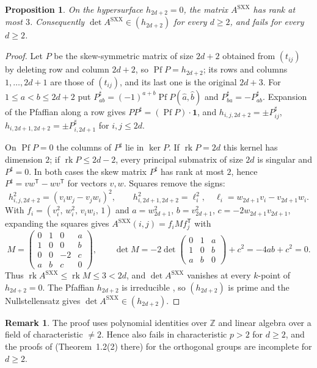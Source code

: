 \documentclass[11pt]{article}
\newtheorem{proposition}[theorem]{Proposition}
\theoremstyle{definition}
\newtheorem{remark}[theorem]{Remark}
\newcommand{\rk}{\operatorname{rk}}
\newcommand{\Asxx}{A^{\mathrm{SXX}}}
\DeclareMathOperator{\Pf}{Pf}
\begin{document}
\begin{proposition}\label{prop:rank3}
On the hypersurface $h_{2d+2}=0$, the matrix $\Asxx$ has rank at most $3$. Consequently $\det\Asxx\in(h_{2d+2})$ for every $d\ge2$, and \cite[Lemma~5.2]{SXX23} fails for every $d\ge2$.
\end{proposition}
\begin{proof}
Let $P$ be the skew-symmetric matrix of size $2d+2$ obtained from $(t_{ij})$ by deleting row and column $2d+2$, so $\Pf P=h_{2d+2}$; its rows and columns $1,\dots,2d+1$ are those of $(t_{ij})$, and its last one is the original $2d+3$. For $1\le a<b\le2d+2$ put $P^\sharp_{ab}=(-1)^{a+b}\Pf P(\hat a,\hat b)$ and $P^\sharp_{ba}=-P^\sharp_{ab}$. Expansion of the Pfaffian along a row gives $PP^\sharp=(\Pf P)\cdot\mathbf 1$, and $h_{i,j,2d+2}=\pm P^\sharp_{ij}$, $h_{i,2d+1,2d+2}=\pm P^\sharp_{i,2d+1}$ for $i,j\le2d$.

On $\Pf P=0$ the columns of $P^\sharp$ lie in $\ker P$. If $\rk P=2d$ this kernel has dimension $2$; if $\rk P\le2d-2$, every principal submatrix of size $2d$ is singular and $P^\sharp=0$. In both cases the skew matrix $P^\sharp$ has rank at most $2$, hence $P^\sharp=vw^{\mathsf T}-wv^{\mathsf T}$ for vectors $v,w$. Squares remove the signs:
\[
h^2_{i,j,2d+2}=(v_iw_j-v_jw_i)^2,\qquad h^2_{i,2d+1,2d+2}=\ell_i^2,\quad \ell_i=w_{2d+1}v_i-v_{2d+1}w_i .
\]
With $f_i=(v_i^2,\,w_i^2,\,v_iw_i,\,1)$ and $a=w_{2d+1}^2$, $b=v_{2d+1}^2$, $c=-2w_{2d+1}v_{2d+1}$, expanding the squares gives $\Asxx(i,j)=f_iMf_j^{\mathsf T}$ with
\[
M=\begin{pmatrix}0&1&0&a\\1&0&0&b\\0&0&-2&c\\a&b&c&0\end{pmatrix},\qquad
\det M=-2\det\begin{pmatrix}0&1&a\\1&0&b\\a&b&0\end{pmatrix}+c^2=-4ab+c^2=0 .
\]
Thus $\rk\Asxx\le\rk M\le3<2d$, and $\det\Asxx$ vanishes at every $k$-point of $h_{2d+2}=0$. The Pfaffian $h_{2d+2}$ is irreducible \cite[Lemma~B.2.10]{GW09}, so $(h_{2d+2})$ is prime and the Nullstellensatz gives $\det\Asxx\in(h_{2d+2})$.
\end{proof}

\begin{remark}\label{rem:charp}
The proof uses polynomial identities over $\mathbb Z$ and linear algebra over a field of characteristic $\neq2$. Hence \cite[Lemma~5.2]{SXX23} also fails in characteristic $p>2$ for $d\ge2$, and the proofs of \cite[Thms.~3.5, 4.4]{SXX23} (Theorem~1.2(2) there) for the orthogonal groups are incomplete for $d\ge2$.
\end{remark}
\end{document}
